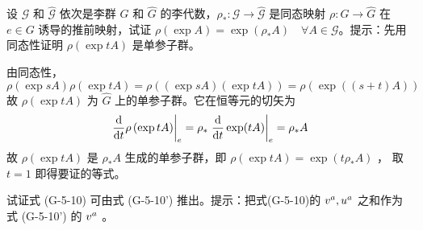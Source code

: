 \begin{xiti}
    \item 设 $\mathscr{G}$ 和 $\hat{\mathscr{G}}$ 依次是李群 $G$ 和 $\hat{G}$ 的李代数，$\rho_* \colon \mathscr{G} \rightarrow \hat{\mathscr{G}}$ 是同态映射 $\rho\colon G\rightarrow \hat{G}$ 在 $e\in G$ 诱导的推前映射，试证 $\rho \left(\exp A\right) = \exp(\rho_* A) \quad \forall A \in \mathscr{G}$。提示：先用同态性证明 $\rho \left(\exp tA\right)$ 是单参子群。
    
    \begin{zm}
    	由同态性，
    	\begin{displaymath}
    	\rho \left(\exp sA\right) \rho \left(\exp tA\right) = \rho \left(\left(\exp sA\right)\left(\exp tA\right)\right) = \rho \left(\exp((s+t)A)\right)
    	\end{displaymath}
    	故 $\rho \left(\exp tA\right)$ 为 $\hat{G}$ 上的单参子群。它在恒等元的切矢为
    	\begin{displaymath}
    	\left.\dv{t} \rho \left(\exp t A\right) \right|_e = \rho_* \left. \dv{t} \exp(tA) \right|_e = \rho_* A
    	\end{displaymath}
    	故 $\rho\left(\exp tA\right)$ 是 $\rho_* A$ 生成的单参子群，即 $\rho\left(\exp tA\right)=\exp(t\rho_* A)$ ， 取 $t=1$ 即得要证的等式。
    \end{zm}
	
	\item 试证式 (G-5-10) 可由式 (G-5-10') 推出。提示：把式(G-5-10)的 $\tensor{v}{^a},\tensor{u}{^a}$ 之和作为式 (G-5-10') 的 $\tensor{v}{^a}$ 。
	

\end{xiti}
